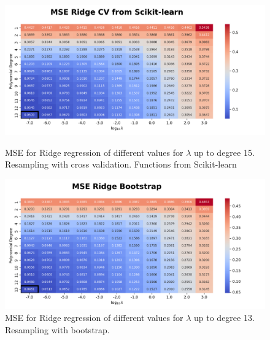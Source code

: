 \documentclass{article}
\begin{document}
\begin{figure}[htbp]
    \centering
    \includegraphics[width=\textwidth]{Project1/figures/Terrain/Heatmap_MSE_Ridge_CV_from_Scikit-learn.png}
    \label{fig:TerrainRidgeCVsklearn}
    \caption{MSE for Ridge regression of different values for $\lambda$ up to degree 15. Resampling with cross validation. Functions from Scikit-learn}
\end{figure}

\begin{figure}[htbp]
    \centering
    \includegraphics[width=\textwidth]{Project1/figures/Terrain/Heatmap_MSE_Ridge_Bootstrap.png}
    \caption{MSE for Ridge regression of different values for $\lambda$ up to degree 13. Resampling with bootstrap.}
    \label{fig:TerrainRidgeBootstrap}
\end{figure}

\newpage
\end{document}
